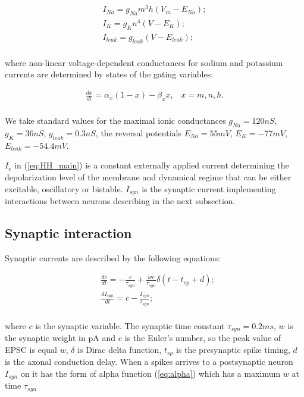\documentclass[aps,pre,twocolumn,groupedaddress]{revtex4-1}
\begin{document}
\begin{equation}
	\label{eq:HH_currents}
	\begin{aligned}
    I_{Na} = g_{Na}m^3h(V_m-E_{Na}); \\
    I_{K} =   g_Kn^4(V-E_K); \\
    I_{leak} = g_{leak}(V-E_{leak});  \\
	\end{aligned}
\end{equation}     
    
where non-linear voltage-dependent conductances for sodium and potassium currents are determined by states of the gating variables:    
 
 \begin{equation}
    \label{eq:gating_variables}
    \begin{aligned}
    \frac{dx}{dt} = \alpha_{x}(1-x)-\beta_{x}x, \;\;\;  x=m,n,h. \\
    \end{aligned}
\end{equation}

We take standard values for the maximal ionic conductances $g_{Na} = 120 nS$, $g_K = 36 nS$, $g_{leak} = 0.3 nS$, the reversal potentials $E_{Na} = 55 mV$, $E_K = - 77 mV$, $E_{leak} = -54.4 mV$. 

$I_{e}$ in (\ref{eq:HH_main}) is a constant externally applied current determining the depolarization level of the membrane and dynamical regime that can be either excitable, oscillatory or bistable. $I_{syn}$ is the synaptic current implementing interactions between neurons describing in the next subsection.

\subsection*{Synaptic interaction}
\label{ss:synapse}
Synaptic currents are described by the following equations:

\begin{equation}
	\label{eq:I_syn}
	\begin{aligned}
    &\frac{dc}{dt} = - \frac{c}{\tau_{syn}} + \frac{w e}{\tau_{syn}} \delta(t-t_{sp} + d);\\
    &\frac{dI_{syn}}{dt} = c - \frac{I_{syn}}{\tau_{syn}};\\
    \end{aligned}
\end{equation}

where $c$ is the synaptic variable. The synaptic time constant $\tau_{syn} = 0.2 ms$, $w$ is the synaptic weight in pA and $e$ is the Euler's number, so the peak value of EPSC is equal $w$, $\delta$ is Dirac delta function, $t_{sp}$ is the presynaptic spike timing, $d$ is the axonal conduction delay. When a spikes arrives to a postsynaptic neuron $I_{syn}$ on it has the form of alpha function (\ref{eq:alpha}) which has a maximum $w$  at time $\tau_{syn}$
\end{document}
